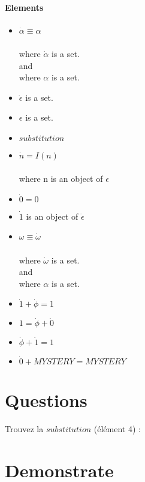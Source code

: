 \documentclass{article}
\begin{document}
      \paragraph{Elements}
        \begin{itemize}
          \item
            $\dot{\alpha} \equiv \alpha$
            ~\\
            ~\\
            where $\dot{\alpha}$ is a set.
            ~\\
            and
            ~\\
	    where $\alpha$ is a set.
          \item
            $\dot{\epsilon}$ is a set.
          \item
            $\epsilon$ is a set.
          \item
            $substitution$
          \item
            $\dot{n} = I(n)$
            ~\\
            ~\\
            where n is an object of $\epsilon$
          \item
            $\dot{0} = 0$
          \item
	    $\dot{1}$ is an object of $\dot{\epsilon}$
          \item
	    $\omega \equiv \dot{\omega}$
            ~\\
            ~\\
            where $\dot{\omega}$ is a set.
            ~\\
            and
            ~\\
	    where $\alpha$ is a set.
          \item
            $\dot{1} + \dot{\phi} = 1$
          \item
            $1 = \dot{\phi} + \dot{0}$
          \item
            $\dot{\phi}+ \dot{1} = 1$
          \item
            $\dot{0} + MYSTERY = MYSTERY$
        \end{itemize}
  \section{Questions}
    Trouvez la $substitution$ (élément 4) :
  \section{Demonstrate}
\end{document}
